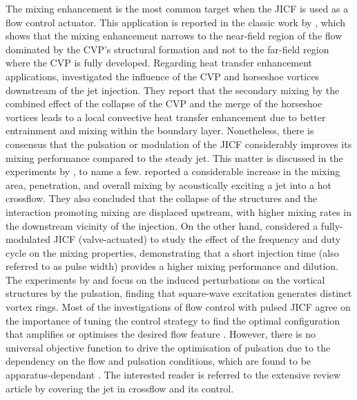 The mixing enhancement is the most common target when the JICF is used as a flow control actuator. This application is reported in the classic work by \citet{smith1998mixing}, which shows that the mixing enhancement narrows to the near-field region of the flow dominated by the CVP's structural formation and not to the far-field region where the CVP is fully developed. Regarding heat transfer enhancement applications, \citet{puzu2019jet} investigated the influence of the CVP and horseshoe vortices downstream of the jet injection. They report that the secondary mixing by the combined effect of the collapse of the CVP and the merge of the horseshoe vortices leads to a local convective heat transfer enhancement due to better entrainment and mixing within the boundary layer. Nonetheless, there is consensus that the pulsation or modulation of the JICF considerably improves its mixing performance compared to the steady jet. This matter is discussed in the experiments by \citet{vermeulen1992mixing, johari1999penetration, eroglu2001structure, MCLOSKEY2002, Johari2006scaling}, to name a few. \citet{vermeulen1992mixing} reported a considerable increase in the mixing area, penetration, and overall mixing by acoustically exciting a jet into a hot crossflow. They also concluded that the collapse of the structures and the interaction promoting mixing are displaced upstream, with higher mixing rates in the downstream vicinity of the injection. On the other hand, \citet{johari1999penetration} considered a fully-modulated JICF (valve-actuated) to study the effect of the frequency and duty cycle on the mixing properties, demonstrating that a short injection time (also referred to as pulse width) provides a higher mixing performance and dilution. The experiments by \citet{eroglu2001structure} and \citet{MCLOSKEY2002} focus on the induced perturbations on the vortical structures by the pulsation, finding that square-wave excitation generates distinct vortex rings. Most of the investigations of flow control with pulsed JICF agree on the importance of tuning the control strategy to find the optimal configuration that amplifies or optimises the desired flow feature \citep{shapiro2006optimization}. However, there is no universal objective function to drive the optimisation of pulsation due to the dependency on the flow and pulsation conditions, which are found to be apparatus-dependant \citep{MCLOSKEY2002}. The interested reader is referred to the extensive review article by \citet{karagozian2010transverse} covering the jet in crossflow and its control.

